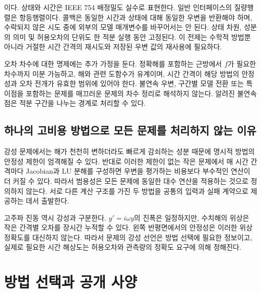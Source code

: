 \documentclass[
  10pt,
  dvipsnames]{article}
\begin{document}
이다. 상태와 시간은 IEEE 754 배정밀도 실수로 표현한다. 일반 인터페이스의
질량행렬은 항등행렬이다. 콜백은 동일한 시간과 상태에 대해 동일한 우변을
반환해야 하며, 수락되지 않은 시도 중에 외부의 모델 매개변수를 바꾸어서는
안 된다. 상태 차원, 성분의 의미 및 허용오차의 단위도 한 적분 실행 동안
고정된다. 이 전제는 수학적 방법뿐 아니라 거절한 시간 간격의 재시도와
저장된 우변 값의 재사용에 필요하다.

오차 차수에 대한 명제에는 추가 가정을 둔다. 정확해를 포함하는 근방에서
\(f\)가 필요한 차수까지 미분 가능하고, 해와 관련 도함수가 유계이며, 시간
간격이 해당 방법의 안정성과 오차 전개가 유효한 범위에 있어야 한다.
불연속 우변, 구간별 모델 전환 또는 특이점을 포함하는 문제를 매끄러운
문제의 차수 정리로 해석하지 않는다. 알려진 불연속점은 적분 구간을 나누는
경계로 처리할 수 있다.

\hypertarget{uxd558uxb098uxc758-uxace0uxbe44uxc6a9-uxbc29uxbc95uxc73cuxb85c-uxbaa8uxb4e0-uxbb38uxc81cuxb97c-uxcc98uxb9acuxd558uxc9c0-uxc54auxb294-uxc774uxc720}{%
\subsection{하나의 고비용 방법으로 모든 문제를 처리하지 않는
이유}\label{uxd558uxb098uxc758-uxace0uxbe44uxc6a9-uxbc29uxbc95uxc73cuxb85c-uxbaa8uxb4e0-uxbb38uxc81cuxb97c-uxcc98uxb9acuxd558uxc9c0-uxc54auxb294-uxc774uxc720}}

강성 문제에서는 해가 천천히 변하더라도 빠르게 감쇠하는 성분 때문에
명시적 방법의 안정성 제한이 엄격해질 수 있다. 반대로 이러한 제한이 없는
작은 문제에서 매 시간 간격마다 Jacobian과 LU 분해를 구성하면 우변을
평가하는 비용보다 부수적인 연산이 더 커질 수 있다. 따라서 범용성은 모든
문제에 동일한 대수 연산을 적용하는 것으로 정의하지 않는다. 서로 다른
계산 구조를 가진 두 방법을 공통의 입력과 실패 계약으로 제공하는 데서
출발한다.

고주파 진동 역시 강성과 구분한다. \(y'=i\omega y\)의 진폭은 일정하지만,
수치해의 위상은 작은 간격별 오차를 장시간 누적할 수 있다. 왼쪽
반평면에서의 안정성은 이러한 위상 정확도를 대신하지 않는다. 따라서
문제의 강성 선언은 방법 선택에 필요한 정보이고, 실제로 필요한 시간
해상도는 허용오차와 관측량의 정확도 요구에 의해 정해진다.

\hypertarget{uxbc29uxbc95-uxc120uxd0dduxacfc-uxacf5uxac1c-uxc0acuxc591}{%
\section{방법 선택과 공개
사양}\label{uxbc29uxbc95-uxc120uxd0dduxacfc-uxacf5uxac1c-uxc0acuxc591}}
\end{document}
